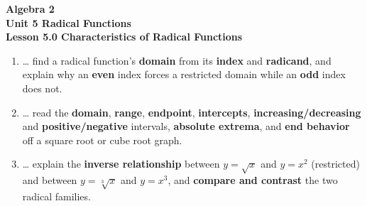 \documentclass[10pt]{article}
\begin{document}
\vspace{-0.8in}

\begin{center}
  {\color{white}\textbf{\LARGE Algebra 2}}\\[4pt]
  {\color{forestmid}\large\textbf{Unit 5 \quad Radical Functions}}\\[6pt]
  {\color{white}\textbf{\large Lesson 5.0 \quad Characteristics of Radical Functions}}
\end{center}

\vspace{0.22in}
\namedateperiod
\vspace{0.18in}

\begin{learningtargetbox}
\small
\begin{enumerate}[leftmargin=1.5em, itemsep=5pt]
  \item \ldots{} find a radical function's \textbf{domain} from its \textbf{index} and \textbf{radicand}, and explain why an \textbf{even} index forces a restricted domain while an \textbf{odd} index does not.
  \item \ldots{} read the \textbf{domain}, \textbf{range}, \textbf{endpoint}, \textbf{intercepts}, \textbf{increasing/decreasing} and \textbf{positive/negative} intervals, \textbf{absolute extrema}, and \textbf{end behavior} off a square root or cube root graph.
  \item \ldots{} explain the \textbf{inverse relationship} between $y=\sqrt{x}$ and $y=x^2$ (restricted) and between $y=\sqrt[3]{x}$ and $y=x^3$, and \textbf{compare and contrast} the two radical families.
\end{enumerate}
\end{learningtargetbox}

\vspace{0.14in}
\end{document}
